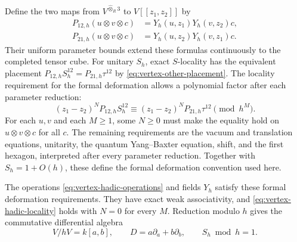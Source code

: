 Define the two maps from $V^{\widehat\otimes_R3}$ to
$V[[z_1,z_2]]$ by
\[
 \begin{aligned}
 P_{12,h}(u\otimes v\otimes c)&=Y_h(u,z_1)Y_h(v,z_2)c,\\
 P_{21,h}(u\otimes v\otimes c)&=Y_h(u,z_2)Y_h(v,z_1)c.
 \end{aligned}
\]
Their uniform parameter bounds extend these formulas continuously
to the completed tensor cube.
For unitary $S_h$, exact $S$-locality has the equivalent placement
$P_{12,h}S_h^{12}=P_{21,h}\tau^{12}$ by
\eqref{eq:vertex-other-placement}.
The locality requirement for the formal deformation allows a polynomial
factor after each parameter reduction:
\begin{equation}\label{eq:vertex-hadic-locality}
 (z_1-z_2)^N P_{12,h}S_h^{12}
   \equiv (z_1-z_2)^N P_{21,h}\tau^{12}\pmod{h^M}.
\end{equation}
For each $u,v$ and each $M\geq1$, some $N\geq0$ must make
the equality hold on $u\otimes v\otimes c$ for all $c$.
The remaining requirements are the vacuum and translation equations,
unitarity, the quantum Yang--Baxter equation, shift, and the first hexagon,
interpreted after every parameter reduction.
Together with $S_h=1+O(h)$, these define the formal deformation
convention used here.

\begin{theorem}\label{thm:vertex-hadic-plane}
The operations \eqref{eq:vertex-hadic-operations} and fields $Y_h$
satisfy these formal deformation requirements.
They have exact weak associativity, and
\eqref{eq:vertex-hadic-locality} holds with $N=0$ for every $M$.
Reduction modulo $h$ gives the commutative differential algebra
\[
 V/hV=k[a,b],\qquad D=a\partial_a+b\partial_b,
 \qquad S_h\bmod h=1.
\]
\end{theorem}

